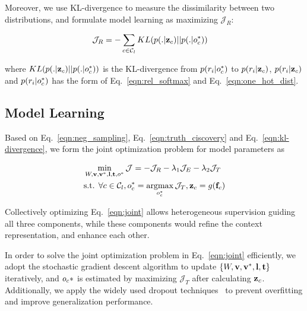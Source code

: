 Moreover, we use KL-divergence to measure the dissimilarity between two distributions, and formulate model learning as maximizing $\mathcal{J}_R$:

\begin{small}
\begin{align}
\mathcal{J}_R &= - \sum_{c \in \mathcal{C}_l} KL(p(. | \mathbf{z}_c)|| p(. |o_c^*)) \label{eqn:kl-divergence}
\end{align}
\end{small}
where {\small $KL(p(. | \mathbf{z}_c)|| p(. |o_c^*))$} is the KL-divergence from {\small  $p(r_i |o_c^*)$ } to {\small $p(r_i | \mathbf{z}_c)$}, {\small $p(r_i | \mathbf{z}_c)$} and {\small $p(r_i |o_c^*)$} has the form of Eq.~\ref{eqn:rel_softmax} and Eq.~\ref{eqn:one_hot_dist}.



\subsection{Model Learning}

Based on Eq.~\ref{eqn:neg_sampling}, Eq.~\ref{eqn:truth_ciscovery} and Eq.~\ref{eqn:kl-divergence}, we form the joint optimization problem for model parameters as

\begin{small}
\begin{align}
&\min_{W, \mathbf{v}, \mathbf{v}^*, \mathbf{l}, \mathbf{t}, o^*} \mathcal{J} = -\mathcal{J}_R - \lambda_1 \mathcal{J}_E - \lambda_2 \mathcal{J}_T \nonumber\\
&\text{s.t. } \forall c \in \mathcal{C}_l, o_c^* = \operatorname*{argmax}_{o_c^*} \mathcal{J}_T, \mathbf{z}_c = g(\mathbf{f}_c) \label{eqn:joint}
\end{align}
\end{small}
Collectively optimizing Eq.~\ref{eqn:joint} allows heterogeneous supervision guiding all three components, while these components would refine the context representation, and enhance each other.


In order to solve the joint optimization problem in Eq.~\ref{eqn:joint} efficiently, we adopt the stochastic gradient descent algorithm to update $\{W, \mathbf{v}, \mathbf{v}^*, \mathbf{l}, \mathbf{t}\}$ iteratively, and $o_c*$ is estimated by maximizing $\mathcal{J}_T$ after calculating $\mathbf{z}_c$. Additionally, we apply the widely used dropout techniques~\cite{srivastava2014dropout} to prevent overfitting and improve generalization performance. 

